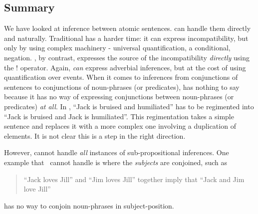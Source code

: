 \subsection{Summary}

We have looked at inference between atomic sentences. \Cathoristic{}
can handle them directly and naturally.  Traditional \fol{} has a
harder time: it can express incompatibility, but only by using
complex machinery - universal quantification, a conditional,
negation. \Cathoristic{}, by contrast, expresses the source of the
incompatibility \emph{directly} using the $!$ operator.  Again, \fol{}
\emph{can} express adverbial inferences, but at the cost of using
quantification over events.  When it comes to inferences from
conjunctions of sentences to conjunctions of noun-phrases (or
predicates), \fol{} has nothing to say because it has no way of
expressing conjunctions between noun-phrases (or predicates) \emph{at
  all}. In \fol{}, ``Jack is bruised and humiliated'' has to be
regimented into ``Jack is bruised and Jack is humiliated''.  
This regimentation takes a simple sentence and replaces it with a more complex one involving a duplication of elements. 
It is not clear this is a step in the right direction.

However, \cathoristic{} cannot handle \emph{all} instances of
sub-propositional inferences.  
One example that \cathoristic\ cannot handle is where the
\emph{subjects} are conjoined, such as
\begin{quote}
``Jack loves Jill'' and ``Jim loves Jill'' together imply that ``Jack and Jim love Jill''
\end{quote}

\NI \Cathoristic{} has no way to conjoin noun-phrases in subject-position.
